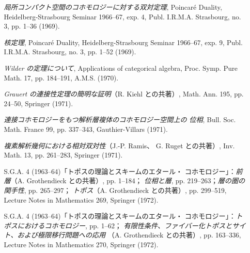 \clearpage
{}
\small
\begin{description}
\item[{[12]}] \emph{局所コンパクト空間のコホモロジーに対する双対定理},
Poincaré Duality, Heidelberg-Strasbourg Seminar 1966--67, exp. 4,
Publ. I.R.M.A. Strasbourg, no. 3, pp. 1--36 (1969).

\item[{[13]}] \emph{核定理}, Poincaré Duality, Heidelberg-Strasbourg
Seminar 1966--67, exp. 9, Publ. I.R.M.A. Strasbourg, no. 3,
pp. 1--52 (1969).

\item[{[14]}] \emph{Wilder の定理について}, Applications of categorical
algebra, Proc. Symp. Pure Math. 17, pp. 184--191, A.M.S. (1970).

\item[{[15]}] \emph{Grauert の連接性定理の簡明な証明}（R. Kiehl との共著）, 
Math. Ann. 195, pp. 24--50, Springer (1971).

\item[{[16]}] \emph{連接コホモロジーをもつ解析層複体のコホモロジー空間上の
位相}, Bull. Soc. Math. France 99, pp. 337--343, Gauthier-Villars
(1971).

\item[{[17]}] \emph{複素解析幾何における相対双対性}（J.-P. Ramis、
G. Ruget との共著）, Inv. Math. 13, pp. 261--283, Springer (1971).

\item[{[18]}] S.G.A. 4 (1963--64)「トポスの理論とスキームのエタール・
コホモロジー」：\emph{前層}（A. Grothendieck との共著）, pp. 1--184；
\emph{位相と層}, pp. 219--263；\emph{層の圏の関手性}, pp. 265--297；
\emph{トポス}（A. Grothendieck との共著）, pp. 299--519,
Lecture Notes in Mathematics 269, Springer (1972).

\item[{[19]}] S.G.A. 4 (1963--64)「トポスの理論とスキームのエタール・
コホモロジー」：\emph{トポスにおけるコホモロジー}, pp. 1--62；
\emph{有限性条件、ファイバー化トポスとサイト、および極限移行問題への応用}
（A. Grothendieck との共著）, pp. 163--336, Lecture Notes in
Mathematics 270, Springer (1972).


\end{description}
